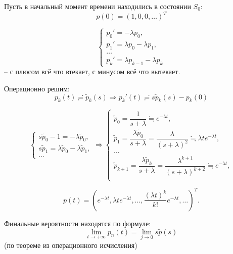 \begin{ex}
  Пусть в начальный момент времени находились в состоянии $S_0$:
  \[
    p(0) = (1, 0, 0, \dots)^T
  \]

  \begin{figure}[h!]
    \centering
  \end{figure}

  \[
    \begin{cases}
      p_0' = -\lambda p_0, \\
      p_1' = \lambda p_0 - \lambda p_1, \\
      \dots \\
      p_k' = \lambda p_{k-1} - \lambda p_k
    \end{cases}
  \]
  -- с плюсом всё что втекает, с минусом всё что вытекает.

  Операционно решим:
  \[
    p_k(t) \risingdotseq \tilde p_k(s) 
    \Rightarrow
    p_k'(t) \risingdotseq s \tilde p_k(s) - p_k(0)
  \]

  \[
    \begin{cases}
      s \tilde p_0 - 1 = - \lambda \tilde p_0, \\
      s \tilde p_1 = \lambda \tilde p_0 - \lambda \tilde p_1, \\
      \dots
      
    \end{cases}
    \Rightarrow
    \begin{cases}
      \tilde p_0 = \dfrac{1}{s+\lambda} \fallingdotseq e^{-\lambda t}, \\
      \tilde p_1 = \dfrac{\lambda \tilde p_0}{s+\lambda} = \dfrac{\lambda}{(s+\lambda)^2}
        \fallingdotseq \lambda t e^{-\lambda t}, \\
      \dots \\
      \tilde p_{k+1} = \dfrac{\lambda \tilde p_k}{s+\lambda}=\dfrac{\lambda^{k+1}}{(s+\lambda)^{k+2}}
        \fallingdotseq e^{-\lambda t}, \\

    \end{cases}
  \]

  \[
    p(t) = \left( e^{-\lambda t}, \lambda t e^{-\lambda t}, \dots, \dfrac{(\lambda t)^k}{k!} e^{-\lambda t}, \dots \right)^T.
  \]
\end{ex}

Финальные вероятности находятся по формуле:
\[
  \lim_{t\to +\infty} p_n(t) = \lim_{j \to 0} s \tilde p(s)
\]
(по теореме из операционного исчисления)
